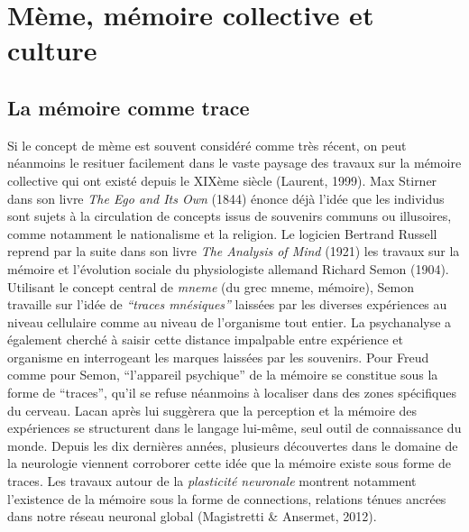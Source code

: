 \section[M\`eme, m\'emoire collective et culture]{M\`eme, m\'emoire collective et culture}
\subsection[La m\'emoire comme trace]{La m\'emoire comme trace}

Si le concept de m\`eme est souvent consid\'er\'e comme tr\`es r\'ecent, on peut n\'eanmoins le resituer facilement dans le vaste paysage des travaux sur la m\'emoire collective qui ont exist\'e depuis le XIX\`eme si\`ecle (Laurent, 1999). Max Stirner dans son livre \textit{The Ego and Its Own }(1844) \'enonce d\'ej\`a l{\textquoteright}id\'ee que les individus sont sujets \`a la circulation de concepts issus de souvenirs communs ou illusoires, comme notamment le nationalisme et la religion. Le logicien Bertrand Russell reprend par la suite dans son livre \textit{The Analysis of Mind }(1921) les travaux sur la m\'emoire et l{\textquoteright}\'evolution sociale du physiologiste allemand Richard Semon (1904). Utilisant le concept central de \textit{mneme} (du grec 
mneme, m\'emoire), Semon travaille sur l{\textquoteright}id\'ee de \textit{{\textquotedblleft}traces mn\'esiques{\textquotedblright} }laiss\'ees par les diverses exp\'eriences au niveau cellulaire comme au niveau de l{\textquoteright}organisme tout entier. La psychanalyse a \'egalement cherch\'e \`a saisir cette distance impalpable entre exp\'erience et organisme en interrogeant les marques laiss\'ees par les souvenirs. Pour Freud comme pour Semon, {\textquotedblleft}l{\textquoteright}appareil psychique{\textquotedblright} de la m\'emoire se constitue sous la forme de {\textquotedblleft}traces{\textquotedblright}, qu{\textquoteright}il se refuse n\'eanmoins \`a localiser dans des zones sp\'ecifiques du cerveau. Lacan apr\`es lui sugg\`erera que la perception et la m\'emoire des exp\'eriences se structurent dans le langage lui-m\^eme, seul outil de connaissance du monde. Depuis les dix derni\`eres ann\'ees, plusieurs d\'ecouvertes dans le domaine de la neurologie viennent corroborer cette id\'ee que la m\'emoire existe sous forme de traces. Les travaux autour de la \textit{plasticit\'e neuronale }montrent notamment l{\textquoteright}existence de la m\'emoire sous la forme de connections, relations t\'enues ancr\'ees dans notre r\'eseau neuronal global (Magistretti \& Ansermet, 2012).  

